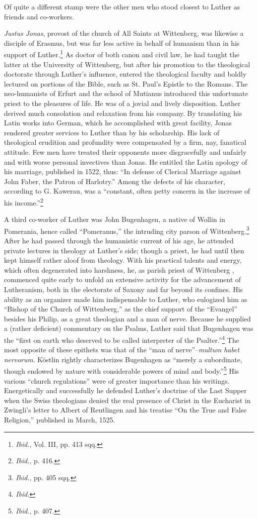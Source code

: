 Of quite a different stamp were the other men who stood closest
to Luther as friends and co-workers.

\textit{Justus Jonas}, provost of the church of All Saints at Wittenberg,
was likewise a disciple of Erasmus, but was far less active in behalf
of humanism than in his support of Luther.\footnote
{\textit{Ibid.}, Vol. III, pp. 413 sqq.}
As doctor of both
canon and civil law, he had taught the latter at the University of
Wittenberg, but after his promotion to the theological doctorate
through Luther’s influence, entered the theological faculty and
boldly lectured on portions of the Bible, such as St. Paul’s Epistle to
the Romans. The neo-humanists of Erfurt and the school of Mutianus
introduced this unfortunate priest to the pleasures of life. He was
of a jovial and lively disposition. Luther derived much consolation and
relaxation from his company. By translating his Latin works
into German, which he accomplished with great facility, Jonas rendered
greater services to Luther than by his scholarship. His lack of
theological erudition and profundity were compensated by a firm,
nay, fanatical attitude. Few men have treated their opponents more
disgracefully and unfairly and with worse personal invectives than
Jonas. He entitled the Latin apology of his marriage, published in
1522, thus: “In defense of Clerical Marriage against John Faber,
the Patron of Harlotry.” Among the defects of his character, according
to G. Kawerau, was a “constant, often petty concern in
the increase of his income.”\footnote{\textit{Ibid.}, p. 416.}

A third co-worker of Luther was John Bugenhagen, a native of
Wollin in Pomerania, hence called “Pomeranus,” the intruding
city parson of Wittenberg.\footnote{\textit{Ibid.}, pp. 405 sqq.}
After he had passed through the
humanistic current of his age, he attended private lectures in theology
at Luther’s side; though a priest, he had until then kept himself
rather aloof from theology. With his practical talents and energy,
which often degenerated into harshness, he, as parish priest of Wittenberg
, commenced quite early to unfold an extensive activity for
the advancement of Lutheranism, both in the electorate of Saxony
and far beyond its confines. His ability as an organizer made him
indispensable to Luther, who eulogized him as “Bishop of the Church
of Wittenberg,” as the chief support of the “Evangel” besides his
Philip, as a great theologian and a man of nerve. Because he supplied
a (rather deficient) commentary on the Psalms, Luther said that
Bugenhagen was the “first on earth who deserved to be called interpreter
of the Psalter.”\footnote{\textit{Ibid.}}
The most opposite of these epithets
was that of the “man of nerve”--\textit{multum habet nervorum}. Köstlin
rightly characterizes Bugenhagen as “merely a subordinate, though
endowed by nature with considerable powers of mind and body.”\footnote{\textit{Ibid.}, p. 407.}
His various “church regulations” were of greater importance than
his writings. Energetically and successfully he defended Luther’s
doctrine of the Last Supper when the Swiss theologians denied the
real presence of Christ in the Eucharist in Zwingli’s letter to Albert
of Reutlingen and his treatise “On the True and False Religion,”
published in March, 1525.

